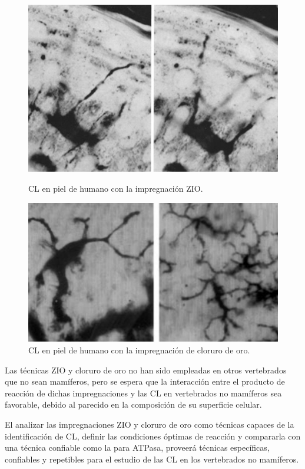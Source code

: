 \begin{figure}[h]
    \begin{minipage}[b]{0.225\textwidth}
        \centering
        \includegraphics[scale=0.2325,frame]{ImpregancionZIO.jpg}
        \caption{\small{CL en piel de humano con la impregnación ZIO.}}
    \end{minipage}
    \hfill
    \begin{minipage}[b]{0.25\textwidth}
        \centering
        \includegraphics[scale=0.2725,frame]{ImpregancionAu.jpg}
        \caption{\small{CL en piel de humano con la impregnación de cloruro de oro.}}
    \end{minipage}
\end{figure}

Las técnicas ZIO y cloruro de oro no han sido empleadas en otros vertebrados que no sean mamíferos, pero se espera que la interacción entre el producto de reacción de dichas impregnaciones y las CL en vertebrados no mamíferos sea favorable, debido al parecido en la composición de su superficie celular.

El analizar las impregnaciones ZIO y cloruro de oro como técnicas capaces de la identificación de CL, definir las condiciones óptimas de reacción y  compararla con una técnica confiable como la  para ATPasa\cite{article:ATPasa}, proveerá técnicas específicas, confiables y repetibles para el estudio de las CL en los vertebrados no mamíferos.